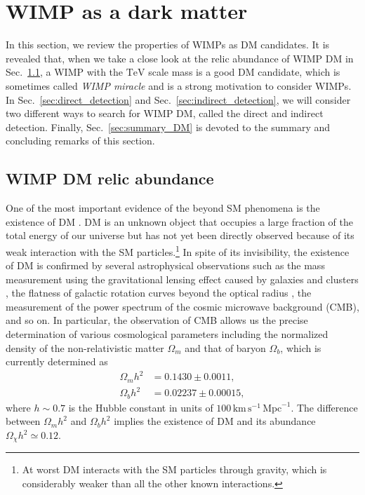 \documentclass[12pt,twoside,book]{article}
\begin{document}
\section{WIMP as a dark matter}
\setcounter{equation}{0}
\label{sec:DM}

\vskip 0.1in

In this section, we review the properties of WIMPs as DM candidates.
It is revealed that, when we take a close look at the relic abundance of WIMP DM in Sec.~\ref{sec:relic}, a WIMP with the $\mathrm{TeV}$ scale mass is a good DM candidate, which is sometimes called \textit{WIMP miracle} and is a strong motivation to consider WIMPs.
In Sec.~\ref{sec:direct_detection} and Sec.~\ref{sec:indirect_detection}, we will consider two different ways to search for WIMP DM, called the direct and indirect detection.
Finally, Sec.~\ref{sec:summary_DM} is devoted to the summary and concluding remarks of this section.


\subsection{WIMP DM relic abundance}
\label{sec:relic}

One of the most important evidence of the beyond SM phenomena is the existence of DM \cite{Zwicky:1933}.
DM is an unknown object that occupies a large fraction of the total energy of our universe but has not yet been directly observed because of its weak interaction with the SM particles.\footnote{
  At worst DM interacts with the SM particles through gravity, which is considerably weaker than all the other known interactions.
}
In spite of its invisibility, the existence of DM is confirmed by several astrophysical observations such as the mass measurement using the gravitational lensing effect caused by galaxies and clusters \cite{Zwicky:1937, Trimble:1987ee}, the flatness of galactic rotation curves beyond the optical radius \cite{1939LicOB..19...41B, Begeman:1991iy}, the measurement of the power spectrum of the cosmic microwave background (CMB), and so on.
In particular, the observation of CMB allows us the precise determination of various cosmological parameters \cite{Jungman:1995av, Jungman:1995bz} including the normalized density of the non-relativistic matter $\Omega_m$ and that of baryon $\Omega_b$, which is currently determined as \cite{Aghanim:2018eyx}
\begin{align}
  \Omega_m h^2 &= 0.1430 \pm 0.0011,\\
  \Omega_b h^2 &= 0.02237 \pm 0.00015,
\end{align}
where $h \sim 0.7$ is the Hubble constant in units of $100\, \mathrm{km}\, \mathrm{s}^{-1}\, \mathrm{Mpc}^{-1}$.
The difference between $\Omega_m h^2$ and $\Omega_b h^2$ implies the existence of DM and its abundance $\Omega_\chi h^2 \simeq 0.12$.
\end{document}
